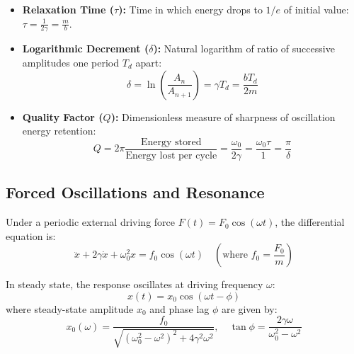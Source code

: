 \documentclass[12pt,a4paper]{article}
\begin{document}
\begin{tcolorbox}[defbox, title={\textbf{Damping Parameters: Logarithmic Decrement and Quality Factor}}]
\begin{itemize}[leftmargin=*, itemsep=3pt]
  \item \textbf{Relaxation Time ($\tau$):} Time in which energy drops to $1/e$ of initial value: $\tau = \frac{1}{2\gamma} = \frac{m}{b}$.
  \item \textbf{Logarithmic Decrement ($\delta$):} Natural logarithm of ratio of successive amplitudes one period $T_d$ apart:
  \begin{equation}
  \delta = \ln\left(\frac{A_n}{A_{n+1}}\right) = \gamma T_d = \frac{b T_d}{2m}
  \end{equation}
  \item \textbf{Quality Factor ($Q$):} Dimensionless measure of sharpness of oscillation energy retention:
  \begin{equation}
  Q = 2\pi \frac{\text{Energy stored}}{\text{Energy lost per cycle}} = \frac{\omega_0}{2\gamma} = \frac{\omega_0 \tau}{1} = \frac{\pi}{\delta}
  \end{equation}
\end{itemize}
\end{tcolorbox}

\subsection{Forced Oscillations and Resonance}

Under a periodic external driving force $F(t) = F_0 \cos(\omega t)$, the differential equation is:
\begin{equation}
\ddot{x} + 2\gamma \dot{x} + \omega_0^2 x = f_0 \cos(\omega t) \quad \left(\text{where } f_0 = \frac{F_0}{m}\right)
\end{equation}

In steady state, the response oscillates at driving frequency $\omega$:
\begin{equation}
x(t) = x_0 \cos(\omega t - \phi)
\end{equation}
where steady-state amplitude $x_0$ and phase lag $\phi$ are given by:
\begin{equation}
x_0(\omega) = \frac{f_0}{\sqrt{(\omega_0^2 - \omega^2)^2 + 4\gamma^2 \omega^2}}, \quad \tan \phi = \frac{2\gamma \omega}{\omega_0^2 - \omega^2}
\end{equation}
\end{document}
